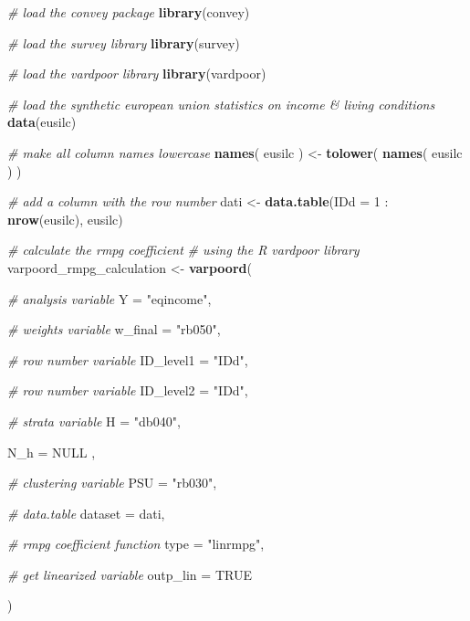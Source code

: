 \documentclass[]{book}
\newenvironment{Shaded}{\begin{snugshade}}{\end{snugshade}}
\newcommand{\KeywordTok}[1]{\textcolor[rgb]{0.13,0.29,0.53}{\textbf{{#1}}}}
\newcommand{\DataTypeTok}[1]{\textcolor[rgb]{0.13,0.29,0.53}{{#1}}}
\newcommand{\DecValTok}[1]{\textcolor[rgb]{0.00,0.00,0.81}{{#1}}}
\newcommand{\StringTok}[1]{\textcolor[rgb]{0.31,0.60,0.02}{{#1}}}
\newcommand{\CommentTok}[1]{\textcolor[rgb]{0.56,0.35,0.01}{\textit{{#1}}}}
\newcommand{\OtherTok}[1]{\textcolor[rgb]{0.56,0.35,0.01}{{#1}}}
\newcommand{\NormalTok}[1]{{#1}}
\theoremstyle{definition}
\theoremstyle{definition}
\theoremstyle{remark}
\begin{document}
\begin{Shaded}
\begin{Highlighting}[]
\CommentTok{# load the convey package}
\KeywordTok{library}\NormalTok{(convey)}

\CommentTok{# load the survey library}
\KeywordTok{library}\NormalTok{(survey)}

\CommentTok{# load the vardpoor library}
\KeywordTok{library}\NormalTok{(vardpoor)}

\CommentTok{# load the synthetic european union statistics on income & living conditions}
\KeywordTok{data}\NormalTok{(eusilc)}

\CommentTok{# make all column names lowercase}
\KeywordTok{names}\NormalTok{( eusilc ) <-}\StringTok{ }\KeywordTok{tolower}\NormalTok{( }\KeywordTok{names}\NormalTok{( eusilc ) )}

\CommentTok{# add a column with the row number}
\NormalTok{dati <-}\StringTok{ }\KeywordTok{data.table}\NormalTok{(}\DataTypeTok{IDd =} \DecValTok{1} \NormalTok{:}\StringTok{ }\KeywordTok{nrow}\NormalTok{(eusilc), eusilc)}

\CommentTok{# calculate the rmpg coefficient}
\CommentTok{# using the R vardpoor library}
\NormalTok{varpoord_rmpg_calculation <-}
\StringTok{    }\KeywordTok{varpoord}\NormalTok{(}
    
        \CommentTok{# analysis variable}
        \DataTypeTok{Y =} \StringTok{"eqincome"}\NormalTok{, }
        
        \CommentTok{# weights variable}
        \DataTypeTok{w_final =} \StringTok{"rb050"}\NormalTok{,}
        
        \CommentTok{# row number variable}
        \DataTypeTok{ID_level1 =} \StringTok{"IDd"}\NormalTok{,}

        \CommentTok{# row number variable}
        \DataTypeTok{ID_level2 =} \StringTok{"IDd"}\NormalTok{,}
                
        \CommentTok{# strata variable}
        \DataTypeTok{H =} \StringTok{"db040"}\NormalTok{, }
        
        \DataTypeTok{N_h =} \OtherTok{NULL} \NormalTok{,}
        
        \CommentTok{# clustering variable}
        \DataTypeTok{PSU =} \StringTok{"rb030"}\NormalTok{, }
        
        \CommentTok{# data.table}
        \DataTypeTok{dataset =} \NormalTok{dati, }
        
        \CommentTok{# rmpg coefficient function}
        \DataTypeTok{type =} \StringTok{"linrmpg"}\NormalTok{,}
      
      \CommentTok{# get linearized variable}
      \DataTypeTok{outp_lin =} \OtherTok{TRUE}
        
    \NormalTok{)}
\end{Highlighting}
\end{Shaded}
\end{document}
